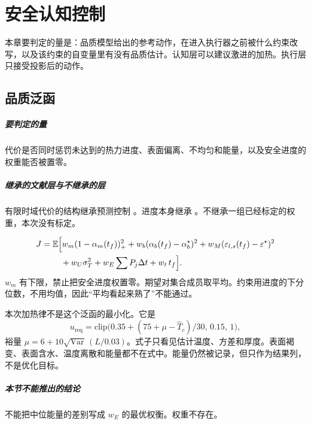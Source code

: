 \chapter{安全认知控制}
\label{ch:safe}

本章要判定的量是：品质模型给出的参考动作，在进入执行器之前被什么约束改写，以及该约束的自变量里有没有品质估计。认知层可以建议激进的加热。执行层只接受投影后的动作。

\section{品质泛函}

\paragraph{要判定的量}
代价是否同时惩罚未达到的热力进度、表面偏离、不均匀和能量，以及安全进度的权重能否被置零。

\paragraph{继承的文献层与不继承的层}
有限时域代价的结构继承预测控制 \cite{rawlings2017}。进度本身继承 \cite{holdsworth1997,vanboekel2008}。不继承一组已经标定的权重，本次没有标定。

\begin{equation}
\label{eq:J}
\begin{aligned}
J={}&\mathbb{E}\Big[
w_m(1-\alpha_m(t_f))_+^2
+w_b(\alpha_b(t_f)-\alpha_b^\star)^2
+w_M(\varepsilon_{l,s}(t_f)-\varepsilon^\star)^2\\
&\quad+w_U\sigma_T^2
+w_E\sum P_j\Delta t
+w_t\,t_f
\Big].
\end{aligned}
\end{equation}
\(w_m\) 有下限，禁止把安全进度权置零。期望对集合成员取平均。约束用进度的下分位数，不用均值，因此“平均看起来熟了”不能通过。

本次加热律不是这个泛函的最小化。它是
\begin{equation}
u_{\mathrm{req}}=\mathrm{clip}\big(0.35+(75+\mu-\hat T_c)/30,\,0.15,\,1\big),
\end{equation}
裕量 \(\mu=6+10\sqrt{\mathrm{Var}}\,(L/0.03)\)。式子只看见估计温度、方差和厚度。表面褐变、表面含水、温度离散和能量都不在式中。能量仍然被记录，但只作为结果列，不是优化目标。

\paragraph{本节不能推出的结论}
不能把中位能量的差别写成 \(w_E\) 的最优权衡。权重不存在。

